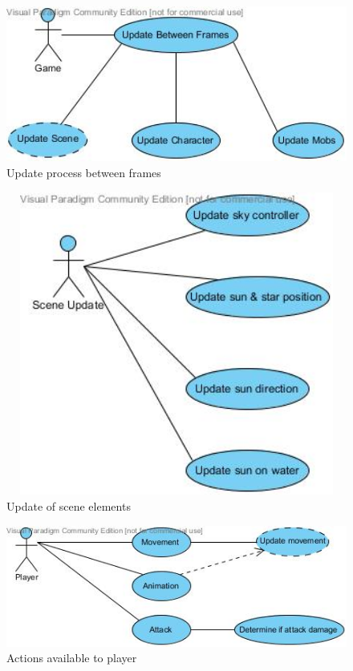 \documentclass[letterpaper]{article}
\begin{document}
					\begin{figure}[H]
					\centering
					\includegraphics[width=140mm]{UML_Diagram/Use_Case/Game_Process.jpg}
					\caption{Update process between frames}
					\end{figure}
					
					\begin{figure}[H]
					\centering
					\includegraphics[width=140mm, height=100mm]{UML_Diagram/Use_Case/Update_Scene.jpg}
					\caption{Update of scene elements}
					\end{figure}
					
					\begin{figure}[H]
					\centering
					\includegraphics[width=140mm]{UML_Diagram/Use_Case/Player_Actions.jpg}
					\caption{Actions available to player}
					\end{figure}
					
\end{document}
